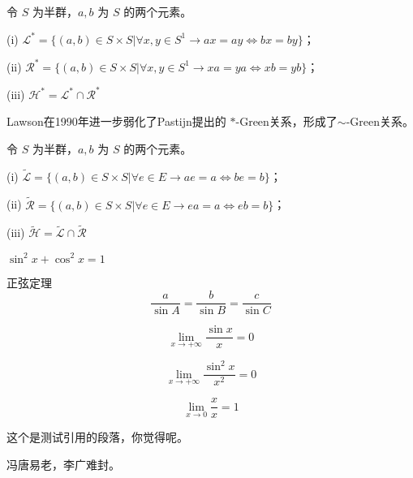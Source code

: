 \begin{definition}
    令 $S$ 为半群，$a, b$ 为 $S$ 的两个元素。

    (i) $\mathcal{L}^{\ast} = \{(a,b)\in S\times S| \forall x,y \in S^1 \rightarrow ax=ay \Leftrightarrow bx=by\}$；

    (ii) $\mathcal{R}^{\ast} = \{(a,b)\in S\times S| \forall x,y \in S^1 \rightarrow xa=ya \Leftrightarrow xb=yb\}$；

    (iii) $\mathcal{H}^{\ast} = \mathcal{L}^{\ast} \cap \mathcal{R}^{\ast}$
\end{definition}

Lawson在1990年进一步弱化了Pastijn提出的 $\ast$-Green关系，形成了$\sim$-Green关系。

\begin{definition}
    令 $S$ 为半群，$a, b$ 为 $S$ 的两个元素。

    (i) $\tilde{\mathcal{L}} = \{(a,b)\in S\times S| \forall e \in E \rightarrow ae=a \Leftrightarrow be=b\}$；

    (ii) $\tilde{\mathcal{R}} = \{(a,b)\in S\times S| \forall e \in E \rightarrow ea=a \Leftrightarrow eb=b\}$；

    (iii) $\tilde{\mathcal{H}} = \tilde{\mathcal{L}} \cap \tilde{\mathcal{R}}$
\end{definition}

\begin{axiom}
    $\sin^2 x + \cos^2 x = 1$
\end{axiom}

\begin{proposition} 正弦定理
    \[
        \frac{a}{\sin A} = \frac{b}{\sin B} = \frac{c}{\sin C}
    \]
\end{proposition}

\begin{example} 
    \[
        \lim_{x\to +\infty} \frac{\sin x}{x} = 0
    \]
\end{example}

\begin{corollary}
    \[
        \lim_{x\to +\infty} \frac{\sin^2 x}{x^2} = 0
    \]
\end{corollary}

\begin{remark}
    \[
        \lim_{x\to 0} \frac{x}{x} = 1
    \]
\end{remark}


这个是测试引用的段落\cite{Ibrahim2022}，你觉得呢\cite[定理 8]{SB2077}。

冯唐易老，李广难封\supercite{SB2077}。


